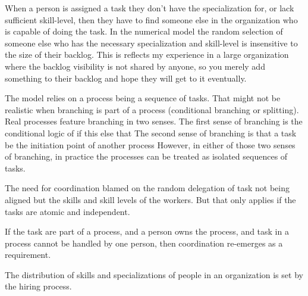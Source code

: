 
When a person is assigned a task they don't have the specialization for, or lack sufficient skill-level, then they have to find someone else in the organization who is capable of doing the task. 
In the numerical model the random selection of someone else who has the necessary specialization and skill-level is insensitive to the size of their backlog. This is reflects my experience in a large organization where the backlog visibility is not shared by anyone, so you merely add something to their backlog and hope they will get to it eventually.



The model relies on a process being a sequence of tasks. That might not be realistic when branching is part of a process (conditional branching or splitting).
Real processes feature branching in two senses. The first sense of branching is the conditional logic of if this else that
The second sense of branching is that a task be the initiation point of another process
However, in either of those two senses of branching, in practice the processes can be treated as isolated sequences of tasks.



The need for coordination blamed on the random delegation of task not being aligned but the skills and skill levels of the workers. 
But that only applies if the tasks are atomic and independent.

If the task are part of a process, and a person owns the process, and task in a process cannot be handled by one person, then coordination re-emerges as a requirement.


The distribution of skills and specializations of people in an organization is set by the hiring process.


